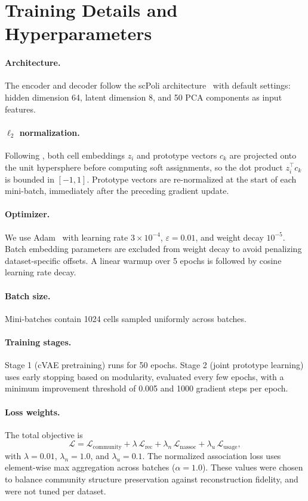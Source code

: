 \section{Training Details and Hyperparameters}
\label{app:training}

\paragraph{Architecture.}
The encoder and decoder follow the scPoli architecture~\citep{scpoli} with default settings: hidden dimension 64, latent dimension 8, and 50 PCA components as input features.

\paragraph{$\ell_2$ normalization.}
Following \citet{swav}, both cell embeddings $z_i$ and prototype vectors $c_k$ are projected onto the unit hypersphere before computing soft assignments, so the dot product $z_i^\top c_k$ is bounded in $[-1,1]$.
Prototype vectors are re-normalized at the start of each mini-batch, immediately after the preceding gradient update.

\paragraph{Optimizer.}
We use Adam~\citep{adam} with learning rate $3 \times 10^{-4}$, $\varepsilon = 0.01$, and weight decay $10^{-5}$.
Batch embedding parameters are excluded from weight decay to avoid penalizing dataset-specific offsets.
A linear warmup over 5 epochs is followed by cosine learning rate decay.

\paragraph{Batch size.}
Mini-batches contain 1024 cells sampled uniformly across batches.

\paragraph{Training stages.}
Stage 1 (cVAE pretraining) runs for 50 epochs.
Stage 2 (joint prototype learning) uses early stopping based on modularity, evaluated every few epochs, with a minimum improvement threshold of 0.005 and 1000 gradient steps per epoch.

\paragraph{Loss weights.}
The total objective is
\[
\mathcal{L} = \mathcal{L}_{\text{community}} + \lambda\,\mathcal{L}_{\text{rec}} + \lambda_n\,\mathcal{L}_{\text{nassoc}} + \lambda_u\,\mathcal{L}_{\text{usage}},
\]
with $\lambda = 0.01$, $\lambda_n = 1.0$, and $\lambda_u = 0.1$.
The normalized association loss uses element-wise max aggregation across batches ($\alpha = 1.0$).
These values were chosen to balance community structure preservation against reconstruction fidelity, and were not tuned per dataset.

